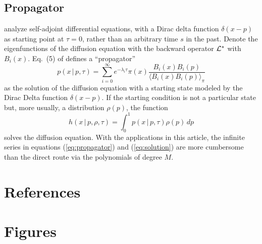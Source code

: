 \documentclass[preprint]{elsarticle}
\newcommand\given{{\,|\,}}
\newcommand\eg{{\it e.g.,}}
\begin{document}
{\subsection{Propagator}\label{section:Greens_function}

\citet{Song12} analyze self-adjoint differential equations, with a Dirac delta function $\delta(x-p)$ as starting point at $\tau=0$, rather than an arbitrary time $s$ in the past. Denote the eigenfunctions of the diffusion equation with the backward operator $\cal{L}^*$ with $B_i(x)$. Eq.~(5) of \citet{Song12} defines a ``propagator'' \citep[][chap.~19]{Bayi06}
\begin{equation}\label{eq:propagator}
    p(x\given p,\tau)=\sum_{i=0}^\infty e^{-\lambda_i \tau}\pi(x) \frac{B_i(x)B_i(p)}{\langle B_i(x)B_i(p) \rangle_{\pi}}
\end{equation}
as the solution of the diffusion equation with a starting state modeled by the Dirac Delta function $\delta(x-p)$. If the starting condition is not a particular state but, more usually, a distribution $\rho(p)$, the function
\begin{equation}\label{eq:solution}
    h(x\given p,\rho,\tau)=\int_0^1 p(x\given p,\tau)\rho(p)\,dp
\end{equation}
solves the diffusion equation. With the applications in this article, the infinite series in equations (\ref{eq:propagator}) and (\ref{eq:solution}) are more cumbersome than the direct route via the polynomials of degree $M$. 



\section*{References}



\newpage

\section*{Figures}

}
\end{document}

